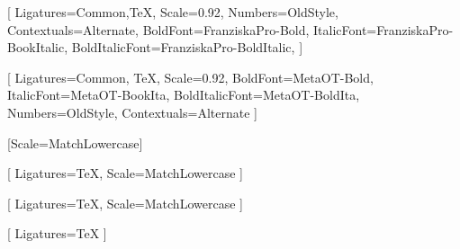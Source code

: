 %



\setmainfont{FranziskaPro-Book}[
    Ligatures={Common,TeX},
    Scale=0.92, %
    Numbers={OldStyle},
    Contextuals={Alternate},
    BoldFont=FranziskaPro-Bold,
    ItalicFont=FranziskaPro-BookItalic,
    BoldItalicFont=FranziskaPro-BoldItalic,
]

\setsansfont{MetaOT-Book}[
    Ligatures={Common, TeX},
    Scale=0.92,
    BoldFont=MetaOT-Bold,
    ItalicFont=MetaOT-BookIta,
    BoldItalicFont=MetaOT-BoldIta,
    Numbers={OldStyle},
    Contextuals={Alternate}
]

\setmonofont{Iosevka}[Scale=MatchLowercase]

[
    Ligatures=TeX,
    Scale=MatchLowercase
]

\setmathfontface{}[
    Ligatures=TeX,
    Scale=MatchLowercase
]

\setoperatorfont\mathoper

\newfontface{}[
    Ligatures=TeX
]
